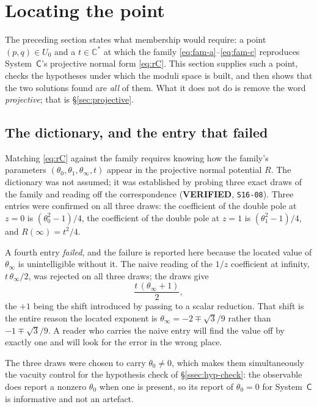 \section{Locating the point}\label{sec:point}

The preceding section states what membership would require: a point
$(p,q)\in U_0$ and a $t\in\mathbb C^{*}$ at which the family
\eqref{eq:fam-a}--\eqref{eq:fam-c} reproduces System~$\mathsf C$'s projective
normal form \eqref{eq:rC}. This section supplies such a point, checks the
hypotheses under which the moduli space is built, and then shows that the two
solutions found are \emph{all} of them. What it does not do is remove the word
\emph{projective}; that is \S\ref{sec:projective}.

\subsection{The dictionary, and the entry that failed}\label{ssec:dictionary}

Matching \eqref{eq:rC} against the family requires knowing how the family's
parameters $(\theta_0,\theta_1,\theta_\infty,t)$ appear in the projective
normal potential $R$. The dictionary was not assumed; it was established by
probing three exact draws of the family and reading off the correspondence
(\textbf{VERIFIED}, \texttt{S16-08}). Three entries were confirmed on all three
draws: the coefficient of the double pole at $z=0$ is $(\theta_0^2-1)/4$, the
coefficient of the double pole at $z=1$ is $(\theta_1^2-1)/4$, and
$R(\infty)=t^2/4$.

A fourth entry \emph{failed}, and the failure is reported here because the
located value of $\theta_\infty$ is unintelligible without it. The naive
reading of the $1/z$ coefficient at infinity, $t\,\theta_\infty/2$, was
rejected on all three draws; the draws give
\[
  \frac{t\,(\theta_\infty+1)}{2},
\]
the $+1$ being the shift introduced by passing to a scalar reduction. That
shift is the entire reason the located exponent is
$\theta_\infty=-2\mp\sqrt3/9$ rather than $-1\mp\sqrt3/9$. A reader who
carries the naive entry will find the value off by exactly one and will look
for the error in the wrong place.

The three draws were chosen to carry $\theta_0\neq0$, which makes them
simultaneously the vacuity control for the hypothesis check of
\S\ref{ssec:hyp-check}: the observable does report a nonzero $\theta_0$ when
one is present, so its report of $\theta_0=0$ for System~$\mathsf C$ is
informative and not an artefact.

